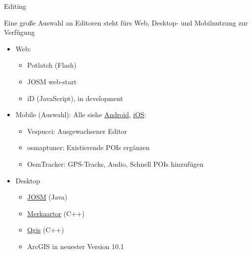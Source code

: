 \documentclass{beamer}
\begin{document}
\begin{frame}{Editing}

  Eine große Auswahl an Editoren steht fürs Web, Desktop- und Mobilnutzung zur Verfügung

  \begin{itemize}
    \item Web:
    \begin{itemize}
      \item Potlatch (Flash)
      \item JOSM web-start
      \item iD (JavaScript), in development
    \end{itemize}
    \item Mobile (Auswahl): Alle siehe  \href{http://wiki.openstreetmap.org/wiki/Android\#OpenStreetMap\_editing\_features}{Android}, \href{http://wiki.openstreetmap.org/wiki/Apple\_iOS\#OpenStreetMap\_editing\_features}{iOS}:
    \begin{itemize}
      \item Vespucci: Ausgewachsener Editor
      \item osmaptuner: Existierende POIs ergänzen
      \item OsmTracker: GPS-Tracks, Audio, Schnell POIs hinzufügen
    \end{itemize}
  \item Desktop
    \begin{itemize}
      \item \href{http://josm.openstreetmap.de}{JOSM} (Java)
      \item \href{http://merkaartor.be}{Merkaartor} (C++)
      \item \href{http://www.qgis.org/}{Qgis} (C++)
      \item ArcGIS in neuester Version 10.1
    \end{itemize}
  \end{itemize}

\end{frame}
\end{document}
